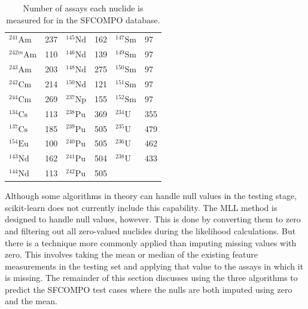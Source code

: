 \begin{table}[!htb]
  \centering
  \begin{tabular}{>{\raggedleft}m{0.6in}
                                m{0.4in}
                  >{\raggedleft}m{0.6in}
                                m{0.4in}
                  >{\raggedleft}m{0.6in}
                                m{0.4in}}
    \toprule
    \rowcolor[gray]{0.88} ${}^{241}\text{Am}$  & 237 & ${}^{145}\text{Nd}$ & 162 & ${}^{147}\text{Sm}$ & 97  \\  
    \rowcolor[gray]{0.95} ${}^{242m}\text{Am}$ & 110 & ${}^{146}\text{Nd}$ & 139 & ${}^{149}\text{Sm}$ & 97  \\ 
    \rowcolor[gray]{0.88} ${}^{243}\text{Am}$  & 203 & ${}^{148}\text{Nd}$ & 275 & ${}^{150}\text{Sm}$ & 97  \\ 
    \rowcolor[gray]{0.95} ${}^{242}\text{Cm}$  & 214 & ${}^{150}\text{Nd}$ & 121 & ${}^{151}\text{Sm}$ & 97  \\ 
    \rowcolor[gray]{0.88} ${}^{244}\text{Cm}$  & 269 & ${}^{237}\text{Np}$ & 155 & ${}^{152}\text{Sm}$ & 97  \\ 
    \rowcolor[gray]{0.95} ${}^{134}\text{Cs}$  & 113 & ${}^{238}\text{Pu}$ & 369 & ${}^{234}\text{U}$  & 355 \\ 
    \rowcolor[gray]{0.88} ${}^{137}\text{Cs}$  & 185 & ${}^{239}\text{Pu}$ & 505 & ${}^{235}\text{U}$  & 479 \\ 
    \rowcolor[gray]{0.95} ${}^{154}\text{Eu}$  & 100 & ${}^{240}\text{Pu}$ & 505 & ${}^{236}\text{U}$  & 462 \\ 
    \rowcolor[gray]{0.88} ${}^{143}\text{Nd}$  & 162 & ${}^{241}\text{Pu}$ & 504 & ${}^{238}\text{U}$  & 433 \\ 
    \rowcolor[gray]{0.95} ${}^{144}\text{Nd}$  & 113 & ${}^{242}\text{Pu}$ & 505 &       &     \\ \bottomrule
  \end{tabular}
  \caption[Number of assays each nuclide is measured for in \acrshort{SFCOMPO}]
          {Number of assays each nuclide is measured for in the 
           \acrshort{SFCOMPO} database.}
  \label{tbl:missing}
\end{table}

Although some algorithms in theory can handle null values in the testing stage,
scikit-learn does not currently include this capability. The \gls{MLL} method
is designed to handle null values, however. This is done by converting them to
zero and filtering out all zero-valued nuclides during the likelihood
calculations. But there is a technique more commonly applied than imputing
missing values with zero. This involves taking the mean or median of the
existing feature measurements in the testing set and applying that value to the
assays in which it is missing.  The remainder of this section discusses using
the three algorithms to predict the \gls{SFCOMPO} test cases where the nulls
are both imputed using zero and the mean.

